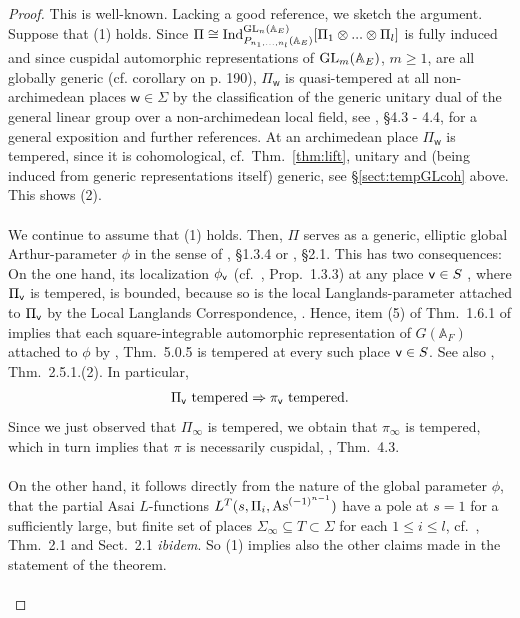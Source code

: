 \documentclass[a4paper,10pt]{amsart}
\theoremstyle{definition}
\numberwithin{equation}{section}
\def\A{\mathbb A}
\def\ww{\mathsf w}
\def\GL{{\rm GL}}
\def\vv{{\sf v}} %
\begin{document}
\begin{proof}
This is well-known. Lacking a good reference, we sketch the argument. Suppose that (1) holds. Since $\Pi\cong{\rm Ind}_{P_{n_1,...,n_l}(\A_E)}^{\GL_n(\A_E)}[\Pi_1\otimes...\otimes\Pi_l]$ is fully induced and since cuspidal automorphic representations of $\GL_m(\A_E)$, $m\geq 1$, are all globally generic (cf. \cite{shal} corollary on p. 190), $\Pi_\ww$ is quasi-tempered at all non-archimedean places $\ww\in\Sigma$ by the classification of the generic unitary dual of the general linear group over a non-archimedean local field, see \cite{kudla}, \S 4.3 - 4.4, for a general exposition and further references. At an archimedean place $\Pi_\ww$ is tempered, since it is cohomological, cf.\ Thm.\ \ref{thm:lift}, unitary and (being induced from generic representations itself) generic, see \S \ref{sect:tempGLcoh} above. This shows (2).\\\\ We continue to assume that (1) holds. Then, $\Pi$ serves as a generic, elliptic global Arthur-parameter $\phi$ in the sense of \cite{KMSW}, \S 1.3.4 or \cite{zou}, \S 2.1. This has two consequences: On the one hand, its localization $\phi_\vv$ (cf.\ \cite{KMSW}, Prop.\ 1.3.3) at any place $\vv\in S$ , where $\Pi_\vv$ is tempered, is bounded, because so is the local Langlands-parameter attached to $\Pi_{\vv}$ by the Local Langlands Correspondence, \cite{HT, henniart}. Hence, item (5) of Thm.\ 1.6.1 of \cite{KMSW} implies that each square-integrable automorphic representation of $G(\A_{F})$ attached to $\phi$ by \cite{KMSW}, Thm.\ 5.0.5 is tempered at every such place $\vv\in S$. See also \cite{zou}, Thm.\ 2.5.1.(2). In particular, 
\begin{equation}\label{eq:temp}
\Pi_\vv \ \textrm{tempered}\Rightarrow \pi_\vv \ \textrm{tempered.}
\end{equation}
Since we just observed that $\Pi_\infty$ is tempered, we obtain that $\pi_\infty$ is tempered, which in turn implies that $\pi$ is necessarily cuspidal, \cite{wallach}, Thm.\ 4.3.\\\\ 
On the other hand, it follows directly from the nature of the global parameter $\phi$, that the partial Asai $L$-functions $L^T(s,\Pi_i,{\rm As}^{(-1)^{n-1}})$ have a pole at $s=1$ for a sufficiently large, but finite set of places $\Sigma_\infty\subseteq T\subset \Sigma$ for each $1\leq i\leq l$, cf.\ \cite{zou}, Thm.\ 2.1 and Sect.\ 2.1 {\it ibidem}. 
So (1) implies also the other claims made in the statement of the theorem. \\\\

\end{proof}
\end{document}
